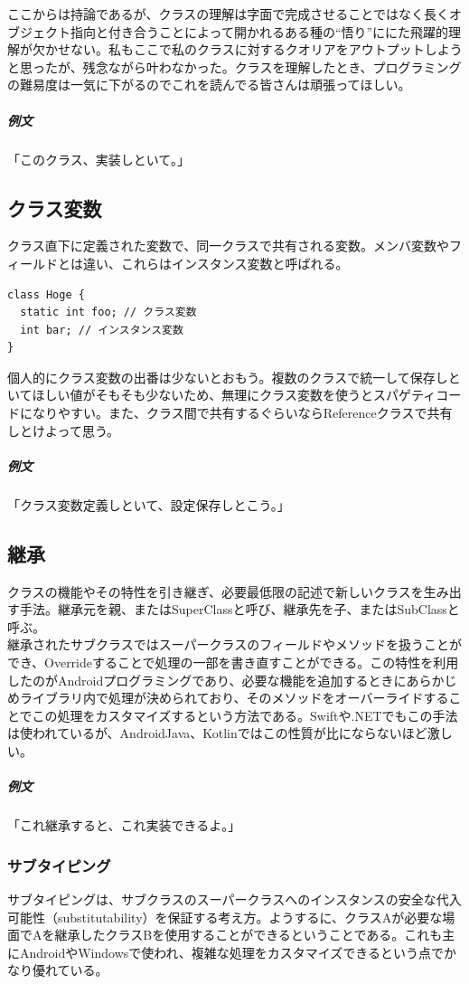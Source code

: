\documentclass[dvipdfmx,jb5]{jreport}
\begin{document}
ここからは持論であるが、クラスの理解は字面で完成させることではなく長くオブジェクト指向と付き合うことによって開かれるある種の``悟り''ににた飛躍的理解が欠かせない。私もここで私のクラスに対するクオリアをアウトプットしようと思ったが、残念ながら叶わなかった。クラスを理解したとき、プログラミングの難易度は一気に下がるのでこれを読んでる皆さんは頑張ってほしい。

\subparagraph{例文} 「このクラス、実装しといて。」

\subsection{クラス変数}
クラス直下に定義された変数で、同一クラスで共有される変数。メンバ変数やフィールドとは違い、これらはインスタンス変数と呼ばれる。

\lstset{language=Java}
\begin{lstlisting}[caption=Javaにおけるクラス変数とインスタンス変数のちがい]
class Hoge {
  static int foo; // クラス変数
  int bar; // インスタンス変数
}
\end{lstlisting}

個人的にクラス変数の出番は少ないとおもう。複数のクラスで統一して保存しといてほしい値がそもそも少ないため、無理にクラス変数を使うとスパゲティコードになりやすい。また、クラス間で共有するぐらいならReferenceクラスで共有しとけよって思う。

\subparagraph{例文} 「クラス変数定義しといて、設定保存しとこう。」

\subsection{継承}
クラスの機能やその特性を引き継ぎ、必要最低限の記述で新しいクラスを生み出す手法。継承元を親、またはSuperClassと呼び、継承先を子、またはSubClassと呼ぶ。
\\

継承されたサブクラスではスーパークラスのフィールドやメソッドを扱うことができ、Overrideすることで処理の一部を書き直すことができる。この特性を利用したのがAndroidプログラミングであり、必要な機能を追加するときにあらかじめライブラリ内で処理が決められており、そのメソッドをオーバーライドすることでこの処理をカスタマイズするという方法である。Swiftや.NETでもこの手法は使われているが、AndroidJava、Kotlinではこの性質が比にならないほど激しい。

\subparagraph{例文} 「これ継承すると、これ実装できるよ。」

\subsubsection {サブタイピング}
サブタイピングは、サブクラスのスーパークラスへのインスタンスの安全な代入可能性（substitutability）を保証する考え方。ようするに、クラスAが必要な場面でAを継承したクラスBを使用することができるということである。これも主にAndroidやWindowsで使われ、複雑な処理をカスタマイズできるという点でかなり優れている。
\end{document}

